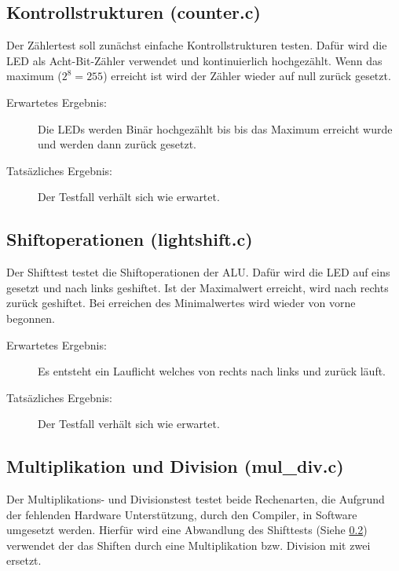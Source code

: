         \subsection{Kontrollstrukturen (counter.c)}\label{lab:counter-test}
            Der Zählertest soll zunächst einfache Kontrollstrukturen testen.
            Dafür wird die LED als Acht-Bit-Zähler verwendet und kontinuierlich hochgezählt.
            Wenn das maximum ($2^8 = 255$) erreicht ist wird der Zähler wieder auf null zurück gesetzt.

            \begin{description}
                \item[Erwartetes Ergebnis:] Die LEDs werden Binär hochgezählt bis
                bis das Maximum erreicht wurde und werden dann zurück gesetzt.
                \item[Tatsäzliches Ergebnis:] Der Testfall verhält sich wie erwartet.
            \end{description}


        \subsection{Shiftoperationen (lightshift.c)}\label{lab:lightshift-test}
            Der Shifttest testet die Shiftoperationen der ALU.
            Dafür wird die LED auf eins gesetzt und nach links geshiftet.
            Ist der Maximalwert erreicht, wird nach rechts zurück geshiftet.
            Bei erreichen des Minimalwertes wird wieder von vorne begonnen.

            \begin{description}
                \item[Erwartetes Ergebnis:] Es entsteht ein Lauflicht welches von
                rechts nach links und zurück läuft.
                \item[Tatsäzliches Ergebnis:] Der Testfall verhält sich wie erwartet.
            \end{description}

        \subsection{Multiplikation und Division (mul\_div.c)}
            Der Multiplikations- und Divisionstest testet beide Rechenarten, die
            Aufgrund der fehlenden Hardware Unterstützung, durch den Compiler, in
            Software umgesetzt werden. Hierfür wird eine Abwandlung des Shifttests
            (Siehe \ref{lab:lightshift-test}) verwendet der das Shiften
            durch eine Multiplikation bzw. Division mit zwei ersetzt.

